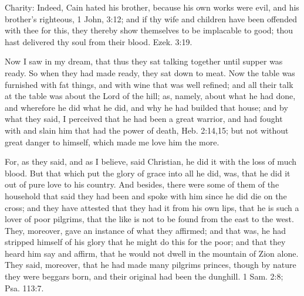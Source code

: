 Charity: Indeed, Cain hated his brother, because his own works were evil, and his brother's righteous, 1 John, 3:12; and if thy wife and children have been offended with thee for this, they thereby show themselves to be implacable to good; thou hast delivered thy soul from their blood. Ezek. 3:19.

Now I saw in my dream, that thus they sat talking together until supper was ready. So when they had made ready, they sat down to meat. Now the table was furnished with fat things, and with wine that was well refined; and all their talk at the table was about the Lord of the hill; as, namely, about what he had done, and wherefore he did what he did, and why he had builded that house; and by what they said, I perceived that he had been a great warrior, and had fought with and slain him that had the power of death, Heb. 2:14,15; but not without great danger to himself, which made me love him the more.

For, as they said, and as I believe, said Christian, he did it with the loss of much blood. But that which put the glory of grace into all he did, was, that he did it out of pure love to his country. And besides, there were some of them of the household that said they had been and spoke with him since he did die on the cross; and they have attested that they had it from his own lips, that he is such a lover of poor pilgrims, that the like is not to be found from the east to the west. They, moreover, gave an instance of what they affirmed; and that was, he had stripped himself of his glory that he might do this for the poor; and that they heard him say and affirm, that he would not dwell in the mountain of Zion alone. They said, moreover, that he had made many pilgrims princes, though by nature they were beggars born, and their original had been the dunghill. 1 Sam. 2:8; Psa. 113:7.

